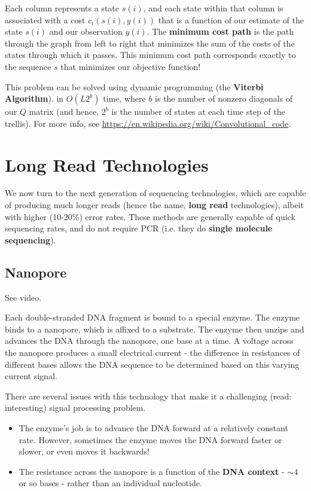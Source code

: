 \documentclass{article}
\begin{document}
Each column represents a state $s(i)$, and each state within that column is associated with a cost $c_i(s(i), y(i))$ that
is a function of our estimate of the state $s(i)$ and our observation $y(i)$. The \textbf{minimum cost path} is the path
through the graph from left to right that minimizes the sum of the costs of the states through which it passes.
This minimum cost path corresponds exactly to the sequence $s$ that minimizes our objective function!

This problem can be solved using dynamic programming (the \textbf{Viterbi Algorithm}).
in $O(L2^b)$ time, where $b$ is the number of nonzero diagonals of our $Q$ matrix (and hence, $2^b$ is
the number of states at each time step of the trellis).
For more info, see \url{https://en.wikipedia.org/wiki/Convolutional_code}.

\section*{Long Read Technologies}
We now turn to the next generation of sequencing technologies, which are capable of producing much longer reads (hence the name,
\textbf{long read} technologies), albeit with higher (10-20\%) error rates. These methods are generally capable of quick sequencing
rates, and do not require PCR (i.e. they do \textbf{single molecule sequencing}).

\subsection*{Nanopore}
See video.

Each double-stranded DNA fragment is bound to a special enzyme. The enzyme binds to a nanopore, which is affixed
to a substrate. The enzyme then unzips and advances the DNA through the nanopore, one base at a time.
A voltage across the nanopore produces a small electrical current - the difference in resistances of
different bases allows the DNA sequence to be determined based on this varying current signal.

There are several issues with this technology that make it a challenging (read: interesting) signal processing problem.
\begin{itemize}
\item The enzyme's job is to advance the DNA forward at a relatively constant rate. However, sometimes the enzyme
moves the DNA forward faster or slower, or even moves it backwards!
\item The resistance across the nanopore is a function of the \textbf{DNA context} - $\sim4$ or so bases - rather than
an individual nucleotide.
\end{itemize}
\end{document}
